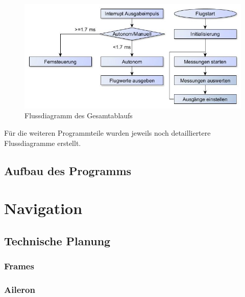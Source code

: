   \begin{figure}[tbh]
    \begin{centering}
      \includegraphics[width = \textwidth]{Bilder/Flussdiagramm}
    \par\end{centering}
    \caption{Flussdiagramm des Gesamtablaufs}
    \label{Flussdiragramm}
  \end{figure}

  Für die weiteren Programmteile wurden jeweils noch detailliertere Flussdiagramme erstellt.

  \subsection{Aufbau des Programms}






\section{Navigation}

  \subsection{Technische Planung}



    \subsubsection{Frames}



    \subsubsection{Aileron}
